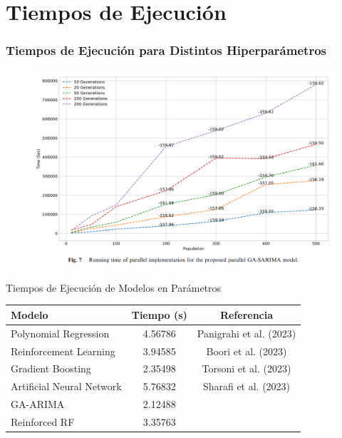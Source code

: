 \documentclass[aspectratio=1610]{beamer}
\begin{document}
\section{Tiempos de Ejecución}

\begin{frame}[fragile]
    \frametitle{Tiempos de Ejecución para Distintos Hiperparámetros}
    \begin{figure}
        \centering
        \includegraphics[width=1\textwidth]{Opti-Imagenes/02-05.png}
    \end{figure}
\end{frame}

\begin{frame}{Tiempos de Ejecución de Modelos en Parámetros}
  \begin{table}[ht]
    \centering
    \scriptsize
    \begin{tabular}{@{}lcc@{}}
      \toprule
      \textbf{Modelo} & \textbf{Tiempo (s)} & \textbf{Referencia} \\
      \midrule
      Polynomial Regression & 4.56786 & Panigrahi et al. (2023) \\
      Reinforcement Learning & 3.94585 & Boori et al. (2023) \\
      Gradient Boosting & 2.35498 & Torsoni et al. (2023) \\
      Artificial Neural Network & 5.76832 & Sharafi et al. (2023) \\
      GA-ARIMA  & 2.12488 & \\
      Reinforced RF  & 3.35763 & \\
      \bottomrule
    \end{tabular}
  \end{table}
\end{frame}
\end{document}
